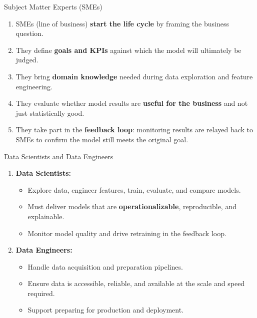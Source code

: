 \begin{frame}{Subject Matter Experts (SMEs)}
\begin{enumerate}
\item<1-> SMEs (line of business) \textbf{start the life cycle} by framing the business question.
\item<2-> They define \textbf{goals and KPIs} against which the model will ultimately be judged.
\item<3-> They bring \textbf{domain knowledge} needed during data exploration and feature engineering.
\item<4-> They evaluate whether model results are \textbf{useful for the business} and not just statistically good.
\item<5-> They take part in the \textbf{feedback loop}: monitoring results are relayed back to SMEs to confirm the model still meets the original goal.
\end{enumerate}
\end{frame}

\begin{frame}{Data Scientists and Data Engineers}
\begin{enumerate}
\item<1-> \textbf{Data Scientists:}
    \begin{itemize}
    \item Explore data, engineer features, train, evaluate, and compare models.
    \item Must deliver models that are \textbf{operationalizable}, reproducible, and explainable.
    \item Monitor model quality and drive retraining in the feedback loop.
    \end{itemize}
\item<2-> \textbf{Data Engineers:}
    \begin{itemize}
    \item Handle data acquisition and preparation pipelines.
    \item Ensure data is accessible, reliable, and available at the scale and speed required.
    \item Support preparing for production and deployment.
    \end{itemize}
\end{enumerate}
\end{frame}

